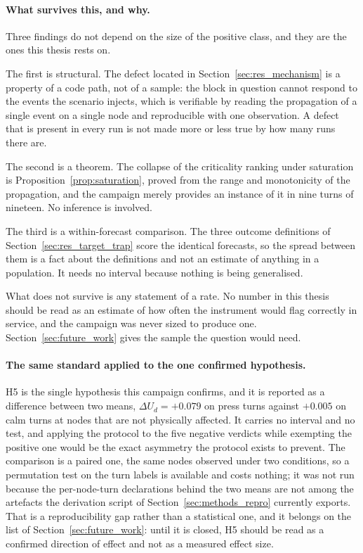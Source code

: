 \paragraph{What survives this, and why.}
Three findings do not depend on the size of the positive class, and they are the ones this
thesis rests on.

The first is structural. The defect located in Section~\ref{sec:res_mechanism} is a
property of a code path, not of a sample: the block in question cannot respond to the events
the scenario injects, which is verifiable by reading the propagation of a single event on a
single node and reproducible with one observation. A defect that is present in every run is
not made more or less true by how many runs there are.

The second is a theorem. The collapse of the criticality ranking under saturation is
Proposition~\ref{prop:saturation}, proved from the range and monotonicity of the propagation,
and the campaign merely provides an instance of it in nine turns of nineteen. No inference is
involved.

The third is a within-forecast comparison. The three outcome definitions of
Section~\ref{sec:res_target_trap} score the identical forecasts, so the spread between them
is a fact about the definitions and not an estimate of anything in a population. It needs no
interval because nothing is being generalised.

What does not survive is any statement of a rate. No number in this thesis should be read as
an estimate of how often the instrument would flag correctly in service, and the campaign was
never sized to produce one. Section~\ref{sec:future_work} gives the sample the question would
need.

\paragraph{The same standard applied to the one confirmed hypothesis.}
H5 is the single hypothesis this campaign confirms, and it is reported as a difference
between two means, $\Delta U_d = +0.079$ on press turns against $+0.005$ on calm turns at
nodes that are not physically affected. It carries no interval and no test, and applying the
protocol to the five negative verdicts while exempting the positive one would be the exact
asymmetry the protocol exists to prevent. The comparison is a paired one, the same nodes
observed under two conditions, so a permutation test on the turn labels is available and
costs nothing; it was not run because the per-node-turn declarations behind the two means are
not among the artefacts the derivation script of Section~\ref{sec:methods_repro} currently
exports. That is a reproducibility gap rather than a statistical one,  and it belongs on the list of
Section~\ref{sec:future_work}: until it is closed, H5 should be read as a
confirmed direction of effect and not as a measured effect size.

